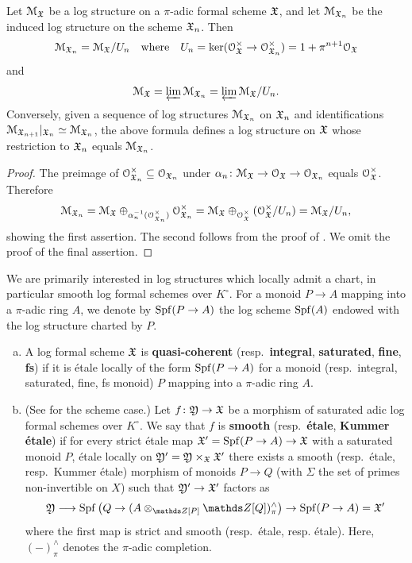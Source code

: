 \begin{lem} \label{lem:log-fsch-equiv}
    Let ${\mathcal M}_{\mathfrak{X}}$ be a log structure on a $\pi$-adic formal scheme ${\mathfrak{X}}$, and let ${\mathcal M}_{{\mathfrak{X}}_n}$ be the induced log structure on the scheme ${\mathfrak{X}}_n$. Then
    \[
    {\mathcal M}_{{\mathfrak{X}}_n} = {\mathcal M}_{\mathfrak{X}}/U_n
    \quad \text{where} \quad
    U_n = \ker({\mathcal O}_{{\mathfrak{X}}}^\times \to {\mathcal O}_{{\mathfrak{X}}_n}^\times) = 1+\pi^{n+1}{\mathcal O}_{\mathfrak{X}}
    \]
    and
    \[ 
        {\mathcal M}_{\mathfrak{X}} = \varprojlim {\mathcal M}_{{\mathfrak{X}}_n} = \varprojlim {\mathcal M}_{\mathfrak{X}}/U_n.
    \]
    Conversely, given a sequence of log structures ${\mathcal M}_{{\mathfrak{X}}_n}$ on ${\mathfrak{X}}_n$ and identifications ${\mathcal M}_{{\mathfrak{X}}_{n+1}}|_{{\mathfrak{X}}_{n}} \simeq {\mathcal M}_{{\mathfrak{X}}_n}$, the above formula defines a log structure on ${\mathfrak{X}}$ whose restriction to ${\mathfrak{X}}_n$ equals ${\mathcal M}_{{\mathfrak{X}}_n}$. 
\end{lem}

\begin{proof}
The preimage of ${\mathcal O}_{{\mathfrak{X}}_n}^\times\subseteq{\mathcal O}_{{\mathfrak{X}}_n}$ under $\alpha_n\colon {\mathcal M}_{{\mathfrak{X}}}\to{\mathcal O}_{\mathfrak{X}}\to{\mathcal O}_{{\mathfrak{X}}_n}$ equals ${\mathcal O}_{\mathfrak{X}}^\times$. Therefore
\[
    {\mathcal M}_{{\mathfrak{X}}_n} = {\mathcal M}_{\mathfrak{X}} \oplus_{\alpha_n^{-1}({\mathcal O}_{{\mathfrak{X}}_n}^\times)} {\mathcal O}_{{\mathfrak{X}}_n}^\times = {\mathcal M}_{{\mathfrak{X}}} \oplus_{{\mathcal O}_{{\mathfrak{X}}}^\times} ({\mathcal O}_{{\mathfrak{X}}}^\times/U_n) = {\mathcal M}_{\mathfrak{X}}/U_n,
\]
showing the first assertion. The second follows from the proof of \cite[Proposition~7.8]{Fersi}. 
We omit the proof of the final assertion.
\end{proof}

We are primarily interested in log structures which locally admit a chart, in particular smooth log formal schemes over $K^\circ$. For a monoid $P\to A$ mapping into a $\pi$-adic ring $A$, we denote by $\operatorname{Spf}(P\to A)$ the log scheme $\operatorname{Spf}(A)$ endowed with the log structure charted by $P$. 

\begin{defi}
    \begin{enumerate}[(a)]
        \item A log formal scheme ${\mathfrak{X}}$ is {\bf quasi-coherent} (resp.\ {\bf integral}, {\bf saturated}, {\bf fine}, {\bf fs}) if it is \'etale locally of the form $\operatorname{Spf}(P\to A)$ for a monoid (resp.\ integral, saturated, fine, fs monoid) $P$ mapping into a $\pi$-adic ring $A$.
        \item (See \cite[Definition~3.5.1]{AHLS-Log} for the scheme case.) Let $f\colon {\mathfrak{Y}}\to{\mathfrak{X}}$ be a morphism of saturated adic log formal schemes over $K^\circ$. We say that $f$ is {\bf smooth} (resp.\ {\bf \'etale}, {\bf Kummer \'etale}) if for every strict \'etale map ${\mathfrak{X}}' = \operatorname{Spf}(P\to A)\to{\mathfrak{X}}$ with a saturated monoid $P$, \'etale locally on ${\mathfrak{Y}}' = {\mathfrak{Y}}\times_{\mathfrak{X}}{\mathfrak{X}}'$ there exists a  smooth (resp.\ \'etale, resp.\ Kummer \'etale) morphism of monoids $P\to Q$ (with $\Sigma$ the set of primes non-invertible on $X$) such that ${\mathfrak{Y}}'\to{\mathfrak{X}}'$ factors as
    \[
        \fY\la \Spf\left(Q\to (A\otimes_{\bZ[P]}\bZ[Q])^\wedge_\pi\right) \to \Spf(P\to A) = \fX'
    \]
    where the first map is strict and smooth (resp.\ \'etale, resp. \'etale). Here, $(-)^\wedge_\pi$ denotes the $\pi$-adic completion.  
    \end{enumerate}
\end{defi}


